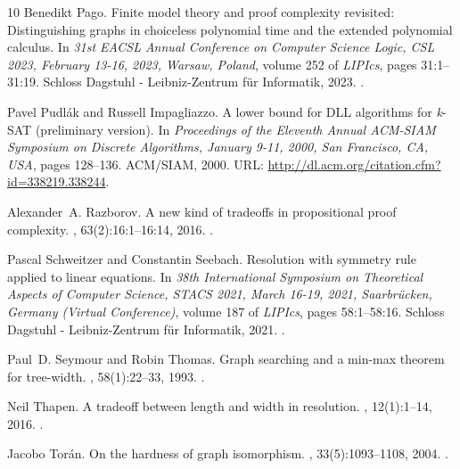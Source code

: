\documentclass[10pt,a4paper]{article}
\begin{document}
\begin{thebibliography}{10}
Benedikt Pago.
\newblock Finite model theory and proof complexity revisited: Distinguishing
  graphs in choiceless polynomial time and the extended polynomial calculus.
\newblock In {\em 31st {EACSL} Annual Conference on Computer Science Logic,
  {CSL} 2023, February 13-16, 2023, Warsaw, Poland}, volume 252 of {\em
  LIPIcs}, pages 31:1--31:19. Schloss Dagstuhl - Leibniz-Zentrum f{\"{u}}r
  Informatik, 2023.
\newblock \href {https://doi.org/10.4230/LIPICS.CSL.2023.31}
  {}.

Pavel Pudl{\'{a}}k and Russell Impagliazzo.
\newblock A lower bound for {DLL} algorithms for \emph{k}-{SAT} (preliminary
  version).
\newblock In {\em Proceedings of the Eleventh Annual {ACM-SIAM} Symposium on
  Discrete Algorithms, January 9-11, 2000, San Francisco, CA, {USA}}, pages
  128--136. {ACM/SIAM}, 2000.
\newblock URL: \url{http://dl.acm.org/citation.cfm?id=338219.338244}.

Alexander~A. Razborov.
\newblock A new kind of tradeoffs in propositional proof complexity.
, 63(2):16:1--16:14, 2016.
\newblock \href {https://doi.org/10.1145/2858790} {}.

Pascal Schweitzer and Constantin Seebach.
\newblock Resolution with symmetry rule applied to linear equations.
\newblock In {\em 38th International Symposium on Theoretical Aspects of
  Computer Science, {STACS} 2021, March 16-19, 2021, Saarbr{\"{u}}cken, Germany
  (Virtual Conference)}, volume 187 of {\em LIPIcs}, pages 58:1--58:16. Schloss
  Dagstuhl - Leibniz-Zentrum f{\"{u}}r Informatik, 2021.
\newblock \href {https://doi.org/10.4230/LIPIcs.STACS.2021.58}
  {}.

Paul~D. Seymour and Robin Thomas.
\newblock Graph searching and a min-max theorem for tree-width.
, 58(1):22--33, 1993.
\newblock \href {https://doi.org/10.1006/jctb.1993.1027}
  {}.

Neil Thapen.
\newblock A tradeoff between length and width in resolution.
, 12(1):1--14, 2016.
\newblock \href {https://doi.org/10.4086/TOC.2016.V012A005}
  {}.

Jacobo Tor{\'{a}}n.
\newblock On the hardness of graph isomorphism.
, 33(5):1093--1108, 2004.
\newblock \href {https://doi.org/10.1137/S009753970241096X}
  {}.


\end{thebibliography}
\end{document}

